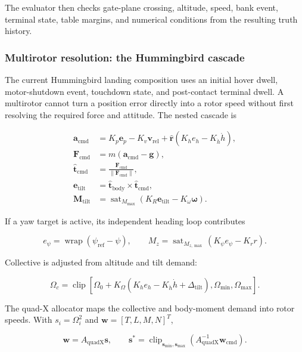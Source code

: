 \documentclass[11pt]{article}
\begin{document}
The evaluator then checks gate-plane crossing, altitude, speed, bank event,
terminal state, table margins, and numerical conditions from the resulting
truth history.

\subsubsection{Multirotor resolution: the Hummingbird cascade}

The current Hummingbird landing composition uses an initial hover dwell,
motor-shutdown event, touchdown state, and post-contact terminal dwell. A
multirotor cannot turn a position error directly into a rotor speed without
first resolving the required force and attitude. The nested cascade is

\[
\begin{aligned}
  \boldsymbol a_{\mathrm{cmd}} &=
    K_p\boldsymbol e_p-K_v\boldsymbol v_{\mathrm{rel}}
    +\hat{\boldsymbol r}(K_h e_h-K_{\dot h}\dot h),\\
  \boldsymbol F_{\mathrm{cmd}} &=m(\boldsymbol a_{\mathrm{cmd}}-\boldsymbol g),\\
  \hat{\boldsymbol t}_{\mathrm{cmd}} &=
    \frac{\boldsymbol F_{\mathrm{cmd}}}{\|\boldsymbol F_{\mathrm{cmd}}\|},\\
  \boldsymbol e_{\mathrm{tilt}} &=
    \hat{\boldsymbol t}_{\mathrm{body}}\times\hat{\boldsymbol t}_{\mathrm{cmd}},\\
  \boldsymbol M_{\mathrm{tilt}} &=
    \operatorname{sat}_{M_{\max}}
    (K_R\boldsymbol e_{\mathrm{tilt}}-K_\omega\boldsymbol\omega).
\end{aligned}
\]

If a yaw target is active, its independent heading loop contributes

\[
  e_\psi=\operatorname{wrap}(\psi_{\mathrm{ref}}-\psi),
  \qquad
  M_z=\operatorname{sat}_{M_{z,\max}}
  (K_\psi e_\psi-K_r r).
\]

Collective is adjusted from altitude and tilt demand:

\[
  \Omega_c=\operatorname{clip}\left[
    \Omega_0+K_\Omega(K_h e_h-K_{\dot h}\dot h+\Delta_{\mathrm{tilt}}),
    \Omega_{\min},\Omega_{\max}\right].
\]

The quad-X allocator maps the collective and body-moment demand into rotor
speeds. With $s_i=\Omega_i^2$ and $\boldsymbol w=[T,L,M,N]^T$,

\[
  \boldsymbol w=A_{\mathrm{quadX}}\boldsymbol s,
  \qquad
  \boldsymbol s^{*}=\operatorname{clip}_{\boldsymbol s_{\min},
  \boldsymbol s_{\max}}
  (A_{\mathrm{quadX}}^{-1}\boldsymbol w_{\mathrm{cmd}}).
\]
\end{document}
